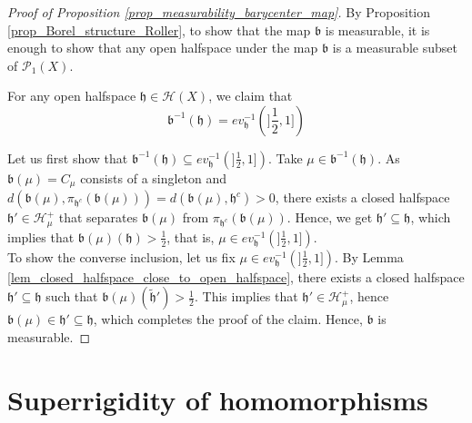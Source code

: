 \documentclass{amsart}
\numberwithin{equation}{section}
\newcommand{\HH}{\mathcal{H}}     %
\newcommand{\hh}{\mathfrak{h}}    %
\newcommand{\bb}{\mathfrak{b}}    %
\newcommand{\PP}{\mathcal{P}}     %
\theoremstyle{definition}
\begin{document}
\begin{proof}[Proof of Proposition \ref{prop_measurability_barycenter_map}]
     By Proposition \ref{prop_Borel_structure_Roller}, to show that the map $\bb$ is measurable, it is enough to show that any open halfspace under the map $\bb$ is a measurable subset of $\PP_1(X)$. \par For any open halfspace $\hh\in\HH(X)$, we claim that
    \[
    \bb^{-1}(\hh)=ev_\hh^{-1}(]\frac{1}{2},1])
    \]


    Let us first show that $ \bb^{-1}(\hh) \subseteq ev_\hh^{-1}(]\frac{1}{2},1])$. Take $\mu\in\bb^{-1}(\hh)$. As $\bb(\mu) = C_\mu$ consists of a singleton and $d(\bb(\mu),\pi_{\hh^c}(\bb(\mu)))=d(\bb(\mu),\hh^c)>0$, there exists a closed halfspace $\hh'\in\HH_\mu^+$ that separates $\bb(\mu)$ from $\pi_{\hh^c}(\bb(\mu))$. Hence, we get $\hh'\subseteq \hh$, which implies that $\bb(\mu)(\hh)>\frac{1}{2}$, that is, $\mu\in ev_\hh^{-1}(]\frac{1}{2},1])$. \\
    To show the converse inclusion, let us fix $\mu\in ev_\hh^{-1}(]\frac{1}{2},1])$.  By Lemma \ref{lem_closed_halfspace_close_to_open_halfspace}, there exists a closed halfspace $\hh'\subseteq \hh$ such that $\bb(\mu)(\tilde{\hh}')>\frac{1}{2}$. This implies that $\hh'\in \HH_\mu^+$, hence $\bb(\mu)\in\hh'\subseteq \hh$, which completes the proof of the claim. Hence, $\bb$ is measurable.
\end{proof}

\section{Superrigidity of homomorphisms}\label{section_superrigidity_of_homomorphisms}

\end{document}

